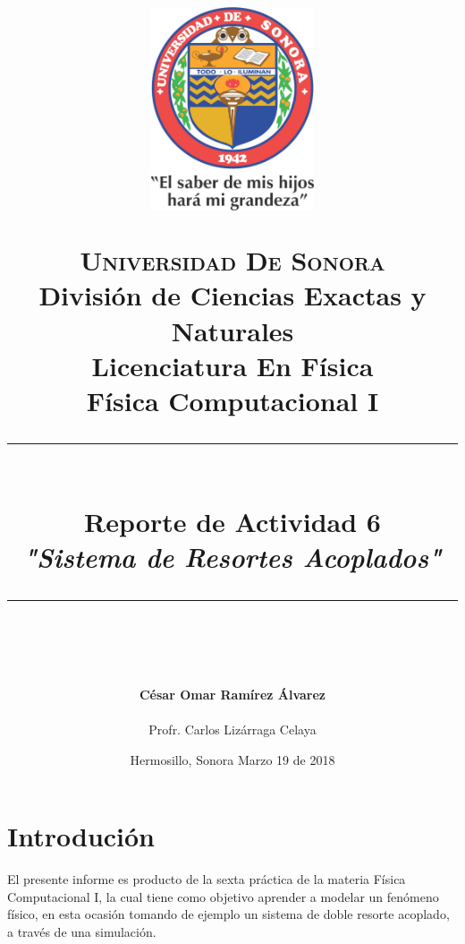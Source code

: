 \documentclass[12pt]{article}
\newcommand{\HRule}[1]{\rule{\linewidth}{#1}}
\begin{document}
\begin{titlepage}

\title{ \normalsize 
        \begin{center}
        \includegraphics[height=6cm]{Logo.jpg}
        \end{center}
        \LARGE \textsc{\textbf{Universidad De Sonora}} \\ \bigskip
		\Large División de Ciencias Exactas y Naturales \\
        Licenciatura En Física \\ \bigskip
        \bigskip
        Física Computacional I
		\\ [0.1cm]  
		\HRule{2pt} \\
		\Large \textbf{{Reporte de Actividad 6}} \\
        \textit{\textbf{"Sistema de Resortes Acoplados"}}
		\HRule{2pt} \\
		\normalsize \vspace*{0.001\baselineskip}}
        
\date{\bigskip \Large Hermosillo, Sonora  \hspace*{\fill}  Marzo 19 de 2018}

        
\author{
		\Large\textbf{ César Omar Ramírez Álvarez} \\ \bigskip
        \\ \bigskip
       \Large Profr. Carlos Lizárraga Celaya}
       \end{titlepage}
       \maketitle
       

\newpage
\pagestyle{plain}

\section*{Introdución}
El presente informe es producto de la sexta práctica de la materia Física Computacional I, la cual tiene como objetivo aprender a modelar un fenómeno físico, en esta ocasión tomando de ejemplo un sistema de doble resorte acoplado, a través de una simulación.\\
\end{document}
